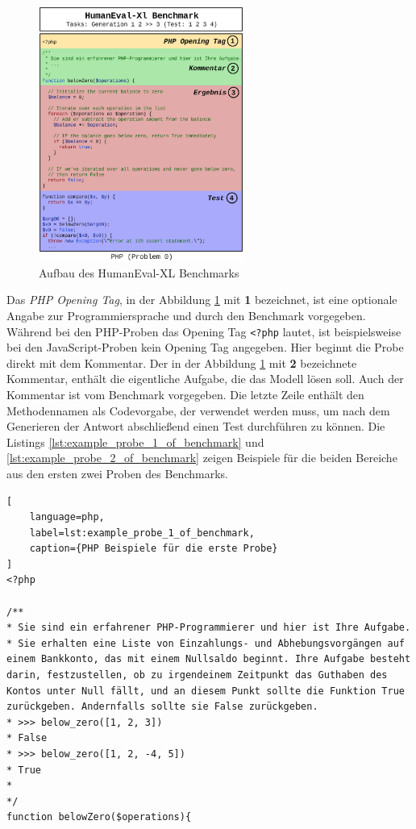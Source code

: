 \begin{figure}[!ht]
	\includegraphics[width=0.6\textwidth]{content/chapter_concept_design/images/code_generation_humaneval_x.eps}
	\centering
	\caption{Aufbau des HumanEval-XL Benchmarks}
	\label{img:code_generation_humaneval}
\end{figure}

Das \textit{PHP Opening Tag}, in der Abbildung \ref{img:code_generation_humaneval} mit \textbf{1} bezeichnet, ist eine optionale Angabe zur Programmiersprache und durch den Benchmark vorgegeben. Während bei den PHP-Proben das Opening Tag \texttt{<?php} lautet, ist beispielsweise bei den JavaScript-Proben kein Opening Tag angegeben. Hier beginnt die Probe direkt mit dem Kommentar. Der in der Abbildung \ref{img:code_generation_humaneval} mit \textbf{2} bezeichnete Kommentar, enthält die eigentliche Aufgabe, die das Modell lösen soll. Auch der Kommentar ist vom Benchmark vorgegeben. Die letzte Zeile enthält den Methodennamen als Codevorgabe, der verwendet werden muss, um nach dem Generieren der Antwort abschließend einen Test durchführen zu können. Die Listings \ref{lst:example_probe_1_of_benchmark} und \ref{lst:example_probe_2_of_benchmark} zeigen Beispiele für die beiden Bereiche aus den ersten zwei Proben des Benchmarks.\vspace{0.2cm}

\begin{lstlisting}[
	language=php,
	label=lst:example_probe_1_of_benchmark,
	caption={PHP Beispiele für die erste Probe}
]
<?php

/**
* Sie sind ein erfahrener PHP-Programmierer und hier ist Ihre Aufgabe.
* Sie erhalten eine Liste von Einzahlungs- und Abhebungsvorgängen auf einem Bankkonto, das mit einem Nullsaldo beginnt. Ihre Aufgabe besteht darin, festzustellen, ob zu irgendeinem Zeitpunkt das Guthaben des Kontos unter Null fällt, und an diesem Punkt sollte die Funktion True zurückgeben. Andernfalls sollte sie False zurückgeben.
* >>> below_zero([1, 2, 3])
* False
* >>> below_zero([1, 2, -4, 5])
* True
*
*/
function belowZero($operations){
\end{lstlisting}


